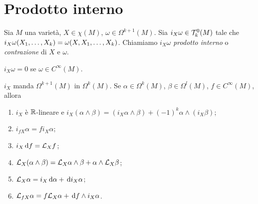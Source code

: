 \section{Prodotto interno}
\begin{definition}
	Sia $M$ una varietà, $X\in\chi(M)$, $\omega\in\Omega^{k+1}(M)$. Sia $i_X\omega \in \Tau_k^0(M)$ tale che $i_X\omega(\seqb Xk,) = \omega(X,\seqb Xk,)$. Chiamiamo $i_X\omega$ \emph{prodotto interno} o \emph{contrazione} di $X$ e $\omega$.
\end{definition}

\begin{remark}
	$i_X\omega = 0$ se $\omega\in C^\infty(M)$.
\end{remark}

\begin{theorem} \label{thm:ProprietaProdottoInterno}
	$i_X$ manda $\Omega^{k+1}(M)$ in $\Omega^k(M)$. Se $\alpha\in\Omega^k(M)$, $\beta\in\Omega^l(M)$, $f\in C^\infty(M)$, allora
	\begin{enumerate}
		\item $i_X$ è $\R$-lineare e $i_X(\alpha\wedge\beta) = (i_X\alpha\wedge \beta) + (-1)^k \alpha \wedge (i_X\beta)$;
		\item $i_{fX}\alpha = f i_X\alpha$;
		\item $i_X\de f = \Lie_X f$;
		\item $\Lie_X(\alpha\wedge\beta) = \Lie_X \alpha \wedge \beta + \alpha \wedge \Lie_X \beta$;
		\item $\Lie_X \alpha = i_X \de\alpha + \de i_X\alpha$;
		\item $\Lie_{fX}\alpha = f\Lie_X\alpha + \de f \wedge i_X\alpha$.
	\end{enumerate}
\end{theorem}
